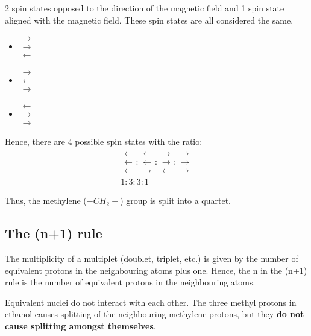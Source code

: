 \documentclass[11pt]{article}
\begin{document}
2 spin states opposed to the direction of the magnetic field and 1 spin state aligned with the magnetic field. These spin states are all considered the same.
\begin{itemize}
\item \(\mathrel{\substack{\textstyle\rightarrow \\[-0.6ex] \textstyle\rightarrow \\[-0.6ex] \textstyle\leftarrow}}\)
\item \(\mathrel{\substack{\textstyle\rightarrow \\[-0.6ex] \textstyle\leftarrow \\[-0.6ex] \textstyle\rightarrow}}\)
\item \(\mathrel{\substack{\textstyle\leftarrow \\[-0.6ex] \textstyle\rightarrow \\[-0.6ex] \textstyle\rightarrow}}\)
\end{itemize}

Hence, there are 4 possible spin states with the ratio:
\begin{align*}
\mathrel{\substack{\textstyle\leftarrow \\[-0.6ex] \textstyle\leftarrow \\[-0.6ex] \textstyle\leftarrow}} : \mathrel{\substack{\textstyle\leftarrow \\[-0.6ex] \textstyle\leftarrow \\[-0.6ex] \textstyle\rightarrow}} : \mathrel{\substack{\textstyle\rightarrow \\[-0.6ex] \textstyle\rightarrow \\[-0.6ex] \textstyle\leftarrow}} : \mathrel{\substack{\textstyle\rightarrow \\[-0.6ex] \textstyle\rightarrow \\[-0.6ex] \textstyle\rightarrow}} \\ 1 : 3 : 3 : 1
\end{align*}

Thus, the methylene (\(-CH_2-\)) group is split into a quartet.
\subsection{The (n+1) rule}
\label{sec:orgfb03021}
The multiplicity of a multiplet (doublet, triplet, etc.) is given by the number of equivalent protons in the neighbouring atoms plus one. Hence, the n in the (n+1) rule is the number of equivalent protons in the neighbouring atoms.

Equivalent nuclei do not interact with each other. The three methyl protons in ethanol causes splitting of the neighbouring methylene protons, but they \textbf{do not cause splitting amongst themselves}.
\end{document}
